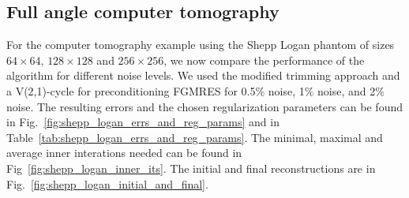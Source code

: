 \subsection{Full angle computer tomography}
For the computer tomography example using the Shepp Logan phantom of sizes $64 \times 64$, $128 \times 128$ and $256 \times 256$, we now compare the performance of the algorithm for different noise levels. We used the modified trimming approach and a V(2,1)-cycle for preconditioning FGMRES for 0.5\% noise, 1\% noise, and 2\% noise. The resulting errors and the chosen regularization parameters can be found in Fig.~\ref{fig:shepp_logan_errs_and_reg_params} and in Table~\ref{tab:shepp_logan_errs_and_reg_params}. The minimal, maximal and average inner interations needed can be found in Fig~\ref{fig:shepp_logan_inner_its}. The initial and final reconstructions are in Fig.~\ref{fig:shepp_logan_initial_and_final}.

